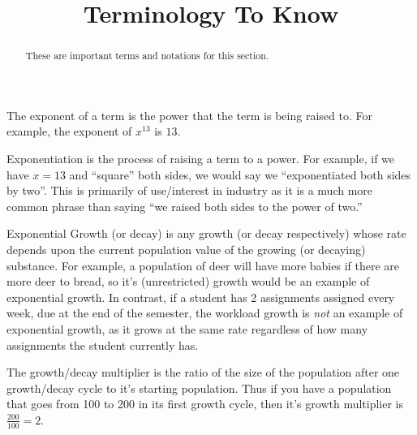 \documentclass{ximeraXloud}
\title{Terminology To Know}
\begin{document}
\begin{abstract}
These are important terms and notations for this section.
\end{abstract}
\maketitle

\begin{definition}[Exponent]
    The exponent of a term is the power that the term is being raised to. For example, the exponent of $x^13$ is $13$.
\end{definition}

\begin{definition}[Exponentiation]
    Exponentiation is the process of raising a term to a power. For example, if we have $x = 13$ and ``square'' both sides, we would say we ``exponentiated both sides by two''. This is primarily of use/interest in industry as it is a much more common phrase than saying ``we raised both sides to the power of two.''
\end{definition}

\begin{definition}
    Exponential Growth (or decay) is any growth (or decay respectively) whose rate depends upon the current population value of the growing (or decaying) substance. For example, a population of deer will have more babies if there are more deer to bread, so it's (unrestricted) growth would be an example of exponential growth. In contrast, if a student has 2 assignments assigned every week, due at the end of the semester, the workload growth is \textit{not} an example of exponential growth, as it grows at the same rate regardless of how many assignments the student currently has. 
\end{definition}

\begin{definition}
    The growth/decay multiplier is the ratio of the size of the population after one growth/decay cycle to it's starting population. Thus if you have a population that goes from 100 to 200 in its first growth cycle, then it's growth multiplier is $\frac{200}{100} = 2$.
\end{definition}
\end{document}
